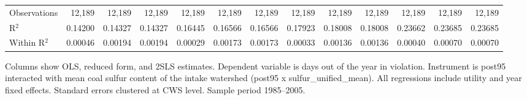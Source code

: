 \begin{table}[htbp]
\begin{adjustbox}{width = \textwidth, center}
\begin{tabular}{lrrrrrrrrrrrr}
          \\
         
         Observations                                                        & 12,189   & 12,189         & 12,189        & 12,189   & 12,189         & 12,189        & 12,189   & 12,189         & 12,189    & 12,189   & 12,189   & 12,189\\  
         R$^2$                                                               & 0.14200  & 0.14327        & 0.14327       & 0.16445  & 0.16566        & 0.16566       & 0.17923  & 0.18008        & 0.18008   & 0.23662  & 0.23685  & 0.23685\\  
         Within R$^2$                                                        & 0.00046  & 0.00194        & 0.00194       & 0.00029  & 0.00173        & 0.00173       & 0.00033  & 0.00136        & 0.00136   & 0.00040  & 0.00070  & 0.00070\\  
         
         \bottomrule
         
      \end{tabular}
      
      
      
   \end{adjustbox}
      {\tiny\linespread{1}\selectfont \par \raggedright 
   Columns show OLS, reduced form, and 2SLS estimates. Dependent variable is days out of the year in violation. Instrument is post95 interacted with mean coal sulfur content of the intake watershed (post95 x sulfur\_unified\_mean). All regressions include utility and year fixed effects. Standard errors clustered at CWS level. Sample period 1985--2005.}
   
\end{table}


